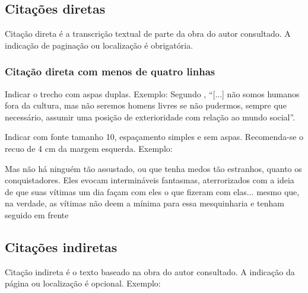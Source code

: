 \subsection{Citações diretas}

Citação direta é a transcrição textual de parte da obra do autor consultado. A indicação de paginação ou localização é obrigatória.

\subsubsection{Citação direta com menos de quatro linhas}

Indicar o trecho com aspas duplas. Exemplo:
Segundo , “[...] não somos humanos fora da cultura, mas não seremos homens livres se não pudermos, sempre que necessário, assumir uma posição de exterioridade com relação ao mundo social”.


Indicar com fonte tamanho 10, espaçamento simples e sem aspas. Recomenda-se o recuo de 4 cm da margem esquerda. Exemplo:
\vspace{1.5pt}
\begin{flushright}
	\begin{minipage}{.724\textwidth}
		{\SingleSpacing\small
			
			Mas não há ninguém tão assustado, ou que tenha medos tão estranhos, quanto os conquistadores. Eles evocam intermináveis fantasmas, aterrorizados com a ideia de que suas vítimas um dia façam com eles o que fizeram com elas... mesmo que, na verdade, as vítimas não deem a mínima para essa mesquinharia e tenham seguido em frente \cite[~ p.253]{Jemisin}
		}
	\end{minipage}
\end{flushright}
\vspace{1.5pt}


\subsection{Citações indiretas}	

Citação indireta é o texto baseado na obra do autor consultado. A indicação da página ou localização é opcional. Exemplo:

